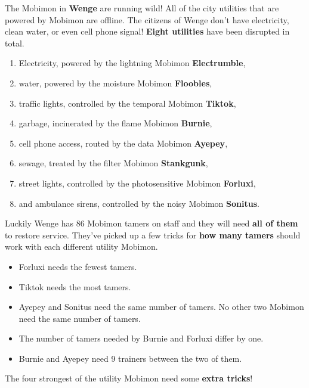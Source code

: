 

The Mobimon in \textbf{Wenge} are running wild! All of the city utilities that
are powered by Mobimon are offline. The citizens of Wenge don't have
electricity, clean water, or even cell phone signal! \textbf{Eight utilities} have
been disrupted in total.
\begin{enumerate}
\item Electricity, powered by the lightning Mobimon \textbf{Electrumble},
\item water, powered by the moisture Mobimon \textbf{Floobles},
\item traffic lights, controlled by the temporal Mobimon \textbf{Tiktok},
\item garbage, incinerated by the flame Mobimon \textbf{Burnie},
\item cell phone access, routed by the data Mobimon \textbf{Ayepey},
\item sewage, treated by the filter Mobimon \textbf{Stankgunk},
\item street lights, controlled by the photosensitive Mobimon \textbf{Forluxi},
\item and ambulance sirens, controlled by the noisy Mobimon \textbf{Sonitus}.
\end{enumerate}


Luckily Wenge has 86 Mobimon tamers on staff and they will need \textbf{all of
  them} to restore service. They've picked up a few tricks for \textbf{how many
  tamers} should work with each different utility Mobimon.

\begin{itemize}
\item Forluxi needs the fewest tamers.
\item Tiktok needs the most tamers.
\item Ayepey and Sonitus need the same number of tamers. No other two Mobimon
  need the same number of tamers.
\item The number of tamers needed by Burnie and Forluxi differ by one.
\item Burnie and Ayepey need 9 trainers between the two of them.
\end{itemize}

The four strongest of the utility Mobimon need some \textbf{extra tricks}!

